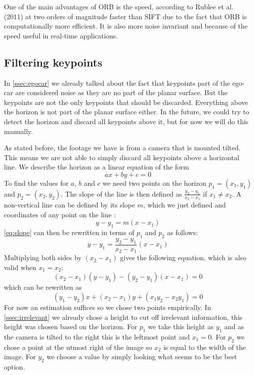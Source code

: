 One of the main advantages of ORB is the speed, according to Rublee et al. (2011) \cite{6126544} at two orders of magnitude faster than SIFT due to the fact that ORB is computationally more efficient. It is also more noise invariant and because of the speed useful in real-time applications.

\subsection{Filtering keypoints}
In \autoref{ssec:egocar} we already talked about the fact that keypoints part of the ego-car are considered noise as they are no part of the planar surface. But the keypoints are not the only keypoints that should be discarded. Everything above the horizon is not part of the planar surface either. In the future, we could try to detect the horizon and discard all keypoints above it, but for now we will do this manually.

As stated before, the footage we have is from a camera that is mounted tilted. This means we are not able to simply discard all keypoints above a horizontal line. We describe the horizon as a linear equation of the form
\begin{equation}\label{eq:linear}
    ax + by + c = 0
\end{equation}
To find the values for $a$, $b$ and $c$ we need two points on the horizon $p_1 = (x_1, y_1)$ and $ p_2 = (x_2, y_2)$. The slope of the line is then defined as $\frac{y_2-y_1}{x_2-x_1}$ if $x_1 \neq x_2$. A non-vertical line can be defined by its slope $m$, which we just defined and coordinates of any point on the line \cite{wiki_linear}:
\begin{equation}\label{eq:slope}
    y - y_1 = m(x-x_1)
\end{equation}
\autoref{eq:slope} can then be rewritten in terms of $p_1$ and $p_2$ as follows:
\begin{equation}
    y - y_1 = \frac{y_2-y_1}{x_2-x_1}(x-x_1)
\end{equation}
Multiplying both sides by $(x_2-x_1)$ gives the following equation, which is also valid when $x_1 = x_2$:
\begin{equation}
    (x_2-x_1)(y-y_1) - (y_2-y_1)(x-x_1) = 0
\end{equation}
which can be rewritten as
\begin{equation}
    (y_1-y_2)x + (x_2-x_1)y + (x_1y_2-x_2y_1) = 0
\end{equation}
For now an estimation suffices so we chose two points empirically. In \autoref{ssec:irrelevant} we already chose a height to cut off irrelevant information, this height was chosen based on the horizon. For $p_1$ we take this height as $y_1$ and as the camera is tilted to the right this is the leftmost point and $x_1 = 0$. For $p_2$ we chose a point at the utmost right of the image so $x_2$ is equal to the width of the image. For $y_2$ we choose a value by simply looking what seems to be the best option. \bigskip


